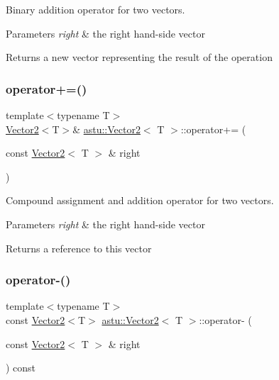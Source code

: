 Binary addition operator for two vectors.


\begin{DoxyParams}{Parameters}
{\em right} & the right hand-\/side vector \\
\hline
\end{DoxyParams}
\begin{DoxyReturn}{Returns}
a new vector representing the result of the operation 
\end{DoxyReturn}
\mbox{\label{classastu_1_1Vector2_a285af566f7b2e4a218932094ab9a70f8}} 
\subsubsection{\texorpdfstring{operator+=()}{operator+=()}}
{\footnotesize\ttfamily template$<$typename T$>$ \\
\hyperlink{classastu_1_1Vector2}{Vector2}$<$T$>$\& \hyperlink{classastu_1_1Vector2}{astu\+::\+Vector2}$<$ T $>$\+::operator+= (\begin{DoxyParamCaption}\item[{const \hyperlink{classastu_1_1Vector2}{Vector2}$<$ T $>$ \&}]{right }\end{DoxyParamCaption})\hspace{0.3cm}{\ttfamily [inline]}}

Compound assignment and addition operator for two vectors.


\begin{DoxyParams}{Parameters}
{\em right} & the right hand-\/side vector \\
\hline
\end{DoxyParams}
\begin{DoxyReturn}{Returns}
a reference to this vector 
\end{DoxyReturn}
\mbox{\label{classastu_1_1Vector2_a694ff874fcdb2118ed665a7cb28978e9}} 
\subsubsection{\texorpdfstring{operator-\/()}{operator-()}\hspace{0.1cm}{\footnotesize\ttfamily [1/2]}}
{\footnotesize\ttfamily template$<$typename T$>$ \\
const \hyperlink{classastu_1_1Vector2}{Vector2}$<$T$>$ \hyperlink{classastu_1_1Vector2}{astu\+::\+Vector2}$<$ T $>$\+::operator-\/ (\begin{DoxyParamCaption}\item[{const \hyperlink{classastu_1_1Vector2}{Vector2}$<$ T $>$ \&}]{right }\end{DoxyParamCaption}) const\hspace{0.3cm}{\ttfamily [inline]}}


